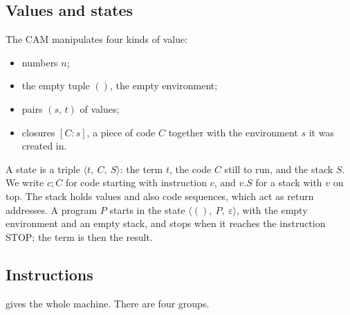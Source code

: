 \documentclass[11pt,a4paper]{article}
\newcommand{\ins}[1]{\textsf{#1}}
\newcommand{\clo}[2]{[#1 : #2]}
\newcommand{\pr}[2]{(#1,\, #2)}
\newcommand{\unit}{()}
\newcommand{\cs}[3]{\langle #1,\ #2,\ #3\rangle}
\newcommand{\seq}{\mathbin{;}}
\theoremstyle{definition}
\theoremstyle{plain}
\begin{document}
\subsection{Values and states}

The CAM manipulates four kinds of value:
\begin{itemize}[itemsep=1pt]
\item numbers $n$;
\item the empty tuple $\unit$, the empty environment;
\item pairs $\pr{s}{t}$ of values;
\item closures $\clo{C}{s}$, a piece of code $C$ together with the
  environment $s$ it was created in.
\end{itemize}
A state is a triple $\cs{t}{C}{S}$: the term $t$, the code $C$ still to run,
and the stack $S$. We write $c\seq C$ for code starting with instruction $c$,
and $v.S$ for a stack with $v$ on top. The stack holds values and also code
sequences, which act as return addresses. A program $P$ starts in the state
$\cs{\unit}{P}{\varepsilon}$, with the empty environment and an empty stack,
and stops when it reaches the instruction \ins{STOP}; the term is then the
result.

\subsection{Instructions}

 gives the whole machine. There are four groups.
\end{document}

